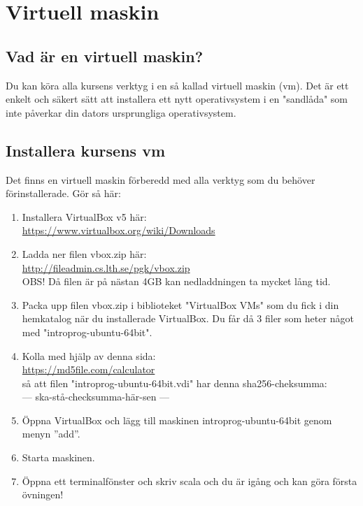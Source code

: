 
\chapter{Virtuell maskin}\label{appendix:vbox}

\section{Vad är en virtuell maskin?}

Du kan köra alla kursens verktyg i en så kallad virtuell maskin (vm). Det är ett enkelt och säkert sätt att installera ett nytt operativsystem i en "sandlåda" som inte påverkar din dators ursprungliga operativsystem. 

\section{Installera kursens vm}
Det finns en virtuell maskin förberedd med alla verktyg som du behöver förinstallerade. Gör så här:
\begin{enumerate}
\item     Installera VirtualBox v5 här: \\ \url{https://www.virtualbox.org/wiki/Downloads}
\item     Ladda ner filen vbox.zip här: \\ \url{http://fileadmin.cs.lth.se/pgk/vbox.zip} \\ OBS! Då filen är på nästan 4GB kan nedladdningen ta mycket lång tid.
\item     Packa upp filen vbox.zip i biblioteket "VirtualBox VMs" som du fick i din hemkatalog när du installerade VirtualBox. Du får då 3 filer som heter något med "introprog-ubuntu-64bit".
\item     Kolla med hjälp av denna sida: \\ \url{https://md5file.com/calculator} \\ så att filen "introprog-ubuntu-64bit.vdi" har denna sha256-cheksumma: \\ --- ska-stå-checksumma-här-sen ---
\item     Öppna VirtualBox och lägg till maskinen introprog-ubuntu-64bit genom menyn ''add''.
\item     Starta maskinen.
\item     Öppna ett terminalfönster och skriv scala och du är igång och kan göra första övningen!
\end{enumerate}

